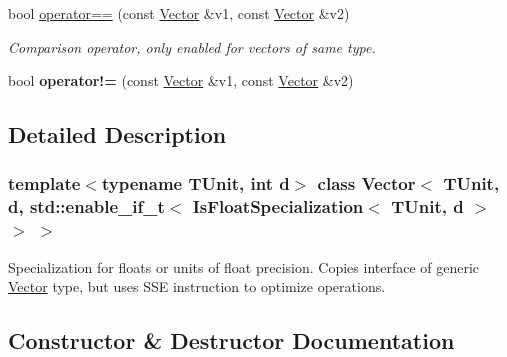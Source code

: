 \begin{DoxyCompactItemize}
bool \hyperlink{classVector_3_01TUnit_00_01d_00_01std_1_1enable__if__t_3_01IsFloatSpecialization_3_01TUnit_00_01d_01_4_01_4_01_4_a7910afb9c9dbb82f155e980c6eba1538}{operator==} (const \hyperlink{classVector}{Vector} \&v1, const \hyperlink{classVector}{Vector} \&v2)
\begin{DoxyCompactList}\small\item\em Comparison operator, only enabled for vectors of same type. \end{DoxyCompactList}\item 
\hypertarget{classVector_3_01TUnit_00_01d_00_01std_1_1enable__if__t_3_01IsFloatSpecialization_3_01TUnit_00_01d_01_4_01_4_01_4_af1f27f848ef4e7c750f8c49ac5fcacea}{}\label{classVector_3_01TUnit_00_01d_00_01std_1_1enable__if__t_3_01IsFloatSpecialization_3_01TUnit_00_01d_01_4_01_4_01_4_af1f27f848ef4e7c750f8c49ac5fcacea} 
bool {\bfseries operator!=} (const \hyperlink{classVector}{Vector} \&v1, const \hyperlink{classVector}{Vector} \&v2)
\end{DoxyCompactItemize}


\subsection{Detailed Description}
\subsubsection*{template$<$typename T\+Unit, int d$>$\newline
class Vector$<$ T\+Unit, d, std\+::enable\+\_\+if\+\_\+t$<$ Is\+Float\+Specialization$<$ T\+Unit, d $>$ $>$ $>$}

Specialization for floats or units of float precision. Copies interface of generic \hyperlink{classVector}{Vector} type, but uses S\+SE instruction to optimize operations. 

\subsection{Constructor \& Destructor Documentation}
\hypertarget{classVector_3_01TUnit_00_01d_00_01std_1_1enable__if__t_3_01IsFloatSpecialization_3_01TUnit_00_01d_01_4_01_4_01_4_a3d1a0ab7e86168769c99d4debe45e181}{}\label{classVector_3_01TUnit_00_01d_00_01std_1_1enable__if__t_3_01IsFloatSpecialization_3_01TUnit_00_01d_01_4_01_4_01_4_a3d1a0ab7e86168769c99d4debe45e181} 
